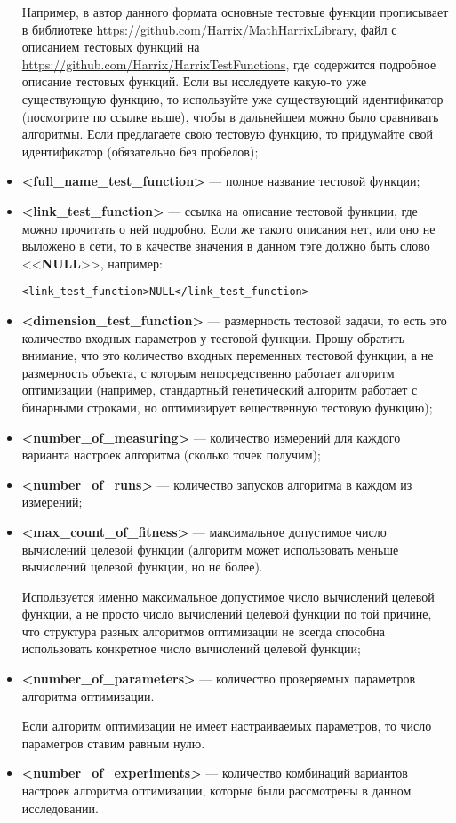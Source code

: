 \documentclass[a4paper,12pt]{article}
\begin{document}
\begin{itemize}
Например, в автор данного формата основные тестовые функции прописывает в библиотеке \href {https://github.com/Harrix/MathHarrixLibrary} {https://github.com/Harrix/MathHarrixLibrary}, файл с описанием тестовых функций на \href {https://github.com/Harrix/HarrixTestFunctions} {https://github.com/Harrix/HarrixTestFunctions}, где содержится подробное описание тестовых функций. Если вы исследуете какую-то уже существующую функцию, то используйте уже существующий идентификатор (посмотрите по ссылке выше), чтобы в дальнейшем можно было сравнивать алгоритмы. Если предлагаете свою тестовую функцию, то придумайте свой идентификатор (обязательно без пробелов);
\item \textbf{<full\_name\_test\_function>} --- полное название тестовой функции;
\item \textbf{<link\_test\_function>} --- ссылка на описание тестовой функции, где можно прочитать о ней подробно. Если же такого описания нет, или оно не выложено в сети, то в качестве значения в данном тэге должно быть слово <<\textbf{NULL}>>, например:
\begin{lstlisting}[label=Part09,caption=У алгоритма нет ссылки в файле Harrix Optimization Testing]
<link_test_function>NULL</link_test_function>
\end{lstlisting}
\item \textbf{<dimension\_test\_function>} --- размерность тестовой задачи, то есть это количество входных параметров у тестовой функции. Прошу обратить внимание, что это количество входных переменных тестовой функции, а не размерность объекта, с которым непосредственно работает алгоритм оптимизации (например, стандартный генетический алгоритм работает с бинарными строками, но оптимизирует вещественную тестовую функцию);
\item \textbf{<number\_of\_measuring>} --- количество измерений для каждого варианта настроек алгоритма (сколько точек получим);
\item \textbf{<number\_of\_runs>} --- количество запусков алгоритма в каждом из измерений;
\item \textbf{<max\_count\_of\_fitness>} --- максимальное допустимое число вычислений целевой функции (алгоритм может использовать меньше вычислений целевой функции, но не более).

Используется именно максимальное допустимое число вычислений целевой функции, а не просто число вычислений целевой функции по той причине, что структура разных алгоритмов оптимизации не всегда способна использовать конкретное число вычислений целевой функции;
\item \textbf{<number\_of\_parameters>} --- количество проверяемых параметров алгоритма оптимизации.

Если алгоритм оптимизации не имеет настраиваемых параметров, то число параметров ставим равным нулю.
\item \textbf{<number\_of\_experiments>} --- количество комбинаций вариантов настроек алгоритма оптимизации, которые были рассмотрены в данном исследовании.
\end{itemize}
\end{document}
